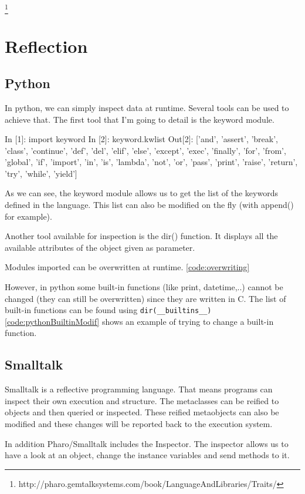 \documentclass[12pt,a4paper]{scrartcl}
\begin{document}
\begin{multicols}{2}
\footnote{http://pharo.gemtalksystems.com/book/LanguageAndLibraries/Traits/}

\section{Reflection}
\subsection{Python}
In python, we can simply inspect data at runtime. Several tools can be used to achieve that. The first tool that I'm going to detail is the keyword module. 

\begin{python}
In [1]: import keyword
In [2]:   keyword.kwlist
Out[2]: ['and', 'assert', 'break', 'class', 'continue', 'def', 'del', 'elif', 'else', 'except', 'exec', 'finally', 'for', 'from', 'global', 'if', 'import', 'in', 'is', 'lambda', 'not', 'or', 'pass', 'print', 'raise', 'return', 'try', 'while', 'yield']
\end{python}
As we can see, the keyword module allows us to get the list of the keywords defined in the language. This list can also be modified on the fly (with append() for example).

Another tool available for inspection is the dir() function. It displays all the available attributes of the object given as parameter.

Modules imported can be overwritten at runtime. \ref{code:overwriting}


However, in python some built-in functions (like print, datetime,..) cannot be changed (they can still be overwritten) since they are written in C.
The list of built-in functions can be found using \lstinline{dir(__builtins__)}
\ref{code:pythonBuiltinModif} shows an example of trying to change a built-in function.



\subsection{Smalltalk}
Smalltalk is a reflective programming language. That means programs can inspect their own execution and structure. The metaclasses can be reified to objects and then queried or inspected. These reified metaobjects can also be modified and these changes will be reported back to the execution system.

In addition Pharo/Smalltalk includes the Inspector. The inspector allows us to have a look at an object, change the instance variables and send methods to it.



\end{multicols}
\end{document}
